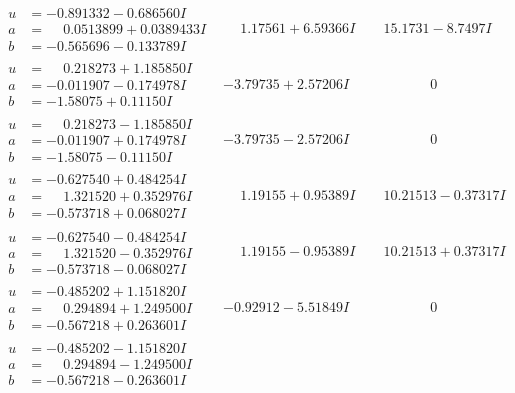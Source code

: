 \documentclass[1p]{elsarticle_modified}
\theoremstyle{definition}
\begin{document}
$$\begin{array}{c|c|c}
\begin{aligned}
u &= -0.891332 - 0.686560 I \\
a &= \phantom{-}0.0513899 + 0.0389433 I \\
b &= -0.565696 - 0.133789 I\end{aligned}
 & \phantom{-}1.17561 + 6.59366 I & \phantom{-}15.1731 - 8.7497 I \\ \hline\begin{aligned}
u &= \phantom{-}0.218273 + 1.185850 I \\
a &= -0.011907 - 0.174978 I \\
b &= -1.58075 + 0.11150 I\end{aligned}
 & -3.79735 + 2.57206 I & \phantom{-0.000000 } 0 \\ \hline\begin{aligned}
u &= \phantom{-}0.218273 - 1.185850 I \\
a &= -0.011907 + 0.174978 I \\
b &= -1.58075 - 0.11150 I\end{aligned}
 & -3.79735 - 2.57206 I & \phantom{-0.000000 } 0 \\ \hline\begin{aligned}
u &= -0.627540 + 0.484254 I \\
a &= \phantom{-}1.321520 + 0.352976 I \\
b &= -0.573718 + 0.068027 I\end{aligned}
 & \phantom{-}1.19155 + 0.95389 I & \phantom{-}10.21513 - 0.37317 I \\ \hline\begin{aligned}
u &= -0.627540 - 0.484254 I \\
a &= \phantom{-}1.321520 - 0.352976 I \\
b &= -0.573718 - 0.068027 I\end{aligned}
 & \phantom{-}1.19155 - 0.95389 I & \phantom{-}10.21513 + 0.37317 I \\ \hline\begin{aligned}
u &= -0.485202 + 1.151820 I \\
a &= \phantom{-}0.294894 + 1.249500 I \\
b &= -0.567218 + 0.263601 I\end{aligned}
 & -0.92912 - 5.51849 I & \phantom{-0.000000 } 0 \\ \hline\begin{aligned}
u &= -0.485202 - 1.151820 I \\
a &= \phantom{-}0.294894 - 1.249500 I \\
b &= -0.567218 - 0.263601 I\end{aligned}

\end{array}$$
\end{document}
